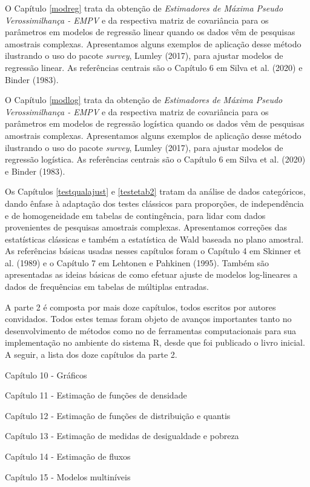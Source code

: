 \documentclass[
  12pt,
  brazilian,
]{book}
\theoremstyle{definition}
\theoremstyle{definition}
\theoremstyle{definition}
\theoremstyle{definition}
\theoremstyle{remark}
\begin{document}
O Capítulo \ref{modreg} trata da obtenção de \emph{Estimadores de Máxima Pseudo Verossimilhança - EMPV} e da respectiva matriz de covariância para os parâmetros em modelos de regressão linear quando os dados vêm de pesquisas amostrais complexas. Apresentamos alguns exemplos de aplicação desse método ilustrando o uso do pacote \emph{survey}, Lumley (2017), para ajustar modelos de regressão linear. As referências centrais são o Capítulo 6 em Silva et al. (2020) e Binder (1983).

O Capítulo \ref{modlog} trata da obtenção de \emph{Estimadores de Máxima Pseudo Verossimilhança - EMPV} e da respectiva matriz de covariância para os parâmetros em modelos de regressão logística quando os dados vêm de pesquisas amostrais complexas. Apresentamos alguns exemplos de aplicação desse método ilustrando o uso do pacote \emph{survey}, Lumley (2017), para ajustar modelos de regressão logística. As referências centrais são o Capítulo 6 em Silva et al. (2020) e Binder (1983).

Os Capítulos \ref{testqualajust} e \ref{testetab2} tratam da análise de dados
categóricos, dando ênfase à adaptação dos testes clássicos para proporções, de independência e de homogeneidade em tabelas de contingência, para lidar com dados provenientes de pesquisas amostrais complexas. Apresentamos correções das estatísticas clássicas e também a estatística de Wald baseada no plano amostral. As referências básicas usadas nesses capítulos foram o Capítulo 4 em Skinner et al. (1989) e o Capítulo 7 em Lehtonen e Pahkinen (1995). Também são apresentadas as ideias básicas de como efetuar ajuste de modelos log-lineares a dados de frequências em tabelas de múltiplas entradas.

A parte 2 é composta por mais doze capítulos, todos escritos por autores convidados. Todos estes temas foram objeto de avanços importantes tanto no desenvolvimento de métodos como no de ferramentas computacionais para sua implementação no ambiente do sistema R, desde que foi publicado o livro inicial. A seguir, a lista dos doze capítulos da parte 2.

Capítulo 10 - Gráficos

Capítulo 11 - Estimação de funções de densidade

Capítulo 12 - Estimação de funções de distribuição e quantis

Capítulo 13 - Estimação de medidas de desigualdade e pobreza

Capítulo 14 - Estimação de fluxos

Capítulo 15 - Modelos multiníveis
\end{document}

